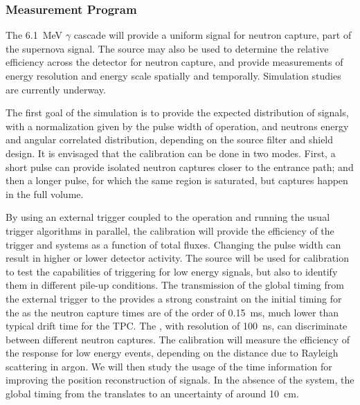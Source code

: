 \subsubsection{Measurement Program}
\label{sec:sp-calib-sys-pns-meas}

The \SI{6.1}{\MeV} $\gamma$ cascade will provide a uniform signal for neutron capture, part of the supernova signal. The source may also be used to determine the relative efficiency across the detector for neutron capture, and provide measurements of energy resolution and energy scale spatially and temporally. Simulation studies are currently underway.


The first goal of the simulation is to provide the expected distribution of signals, with a normalization given by the pulse width of  operation, and neutrons energy and angular correlated distribution, depending on the source filter and shield design.
It is envisaged that the calibration can be done in two modes. First, a short  pulse can provide isolated neutron captures closer to the entrance path; and then a longer 
pulse, for which the same region is saturated, but 
captures 
happen in the full volume.

By using an external trigger coupled to the  operation and running the usual trigger algorithms in parallel, the calibration will provide the efficiency of the trigger and  systems as a function of total fluxes. Changing the pulse width can result in 
higher or lower detector activity. The source will be used for  calibration to test
the capabilities of triggering for low energy signals, but also 
to identify them in different pile-up conditions.
The transmission of the global timing from the external  trigger to the  provides a strong constraint on the initial timing for the 
as the neutron capture times are of the order of 0.15~ms, much lower than typical drift time 
for the TPC. The , with resolution of 100~ns, can discriminate between different neutron captures. The calibration will measure the efficiency of the  response for low energy events, depending on the distance due to Rayleigh scattering in argon. We will then study the usage of the  time information for improving the position reconstruction of  signals. In the absence of the  system, the global timing from the  translates to an uncertainty of around 10~cm.

